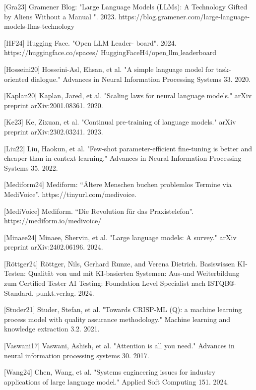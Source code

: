 \documentclass[twocolumn]{article}
\begin{document}
[Gra23] Gramener Blog: "Large Language Models (LLMs): A Technology Gifted by Aliens Without a Manual ". 2023. https://blog.gramener.com/large-language-models-llms-technology

[HF24] Hugging Face. "Open LLM Leader- board". 2024. https://huggingface.co/spaces/
HuggingFaceH4/open$\_$llm$\_$leaderboard

[Hosseini20] Hosseini-Asl, Ehsan, et al. "A simple language model for task-oriented dialogue." Advances in Neural Information Processing Systems 33. 2020.

[Kaplan20] Kaplan, Jared, et al. "Scaling laws for neural language models." arXiv preprint arXiv:2001.08361. 2020. 

[Ke23] Ke, Zixuan, et al. "Continual pre-training of language models." arXiv preprint arXiv:2302.03241. 2023.

[Liu22] Liu, Haokun, et al. "Few-shot parameter-efficient fine-tuning is better and cheaper than in-context learning." Advances in Neural Information Processing Systems 35. 2022.

[Mediform24] Mediform: “Ältere Menschen buchen problemlos Termine via MediVoice”. https://tinyurl.com/medivoice.

[MediVoice] Mediform. “Die Revolution für das Praxistelefon”. https://mediform.io/medivoice/

[Minaee24] Minaee, Shervin, et al. "Large language models: A survey." arXiv preprint arXiv:2402.06196. 2024.

[Röttger24] Röttger, Nils, Gerhard Runze, and Verena Dietrich. Basiswissen KI-Testen: Qualität von und mit KI-basierten Systemen: Aus-und Weiterbildung zum Certified Tester AI Testing: Foundation Level Specialist nach ISTQB®-Standard. punkt.verlag. 2024.

[Studer21] Studer, Stefan, et al. "Towards CRISP-ML (Q): a machine learning process model with quality assurance methodology." Machine learning and knowledge extraction 3.2. 2021.

[Vaswani17] Vaswani, Ashish, et al. "Attention is all you need." Advances in neural information processing systems 30. 2017.

[Wang24] Chen, Wang, et al. "Systems engineering issues for industry applications of large language model." Applied Soft Computing 151. 2024.

\iffalse
\end{document}
